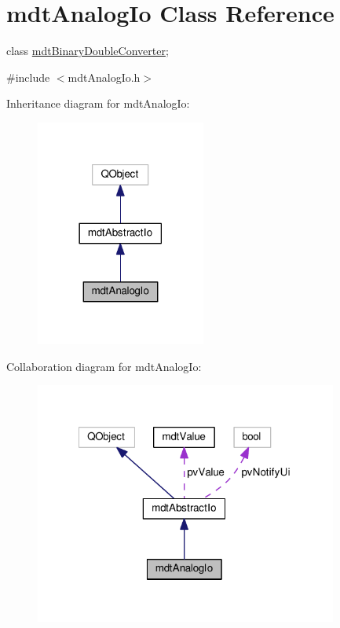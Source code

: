 \hypertarget{classmdt_analog_io}{\section{mdt\-Analog\-Io Class Reference}
\label{classmdt_analog_io}
}


class \hyperlink{classmdt_binary_double_converter}{mdt\-Binary\-Double\-Converter};  




{\ttfamily \#include $<$mdt\-Analog\-Io.\-h$>$}



Inheritance diagram for mdt\-Analog\-Io\-:
\nopagebreak
\begin{figure}[H]
\begin{center}
\leavevmode
\includegraphics[width=158pt]{classmdt_analog_io__inherit__graph}
\end{center}
\end{figure}


Collaboration diagram for mdt\-Analog\-Io\-:
\nopagebreak
\begin{figure}[H]
\begin{center}
\leavevmode
\includegraphics[width=282pt]{classmdt_analog_io__coll__graph}
\end{center}
\end{figure}
